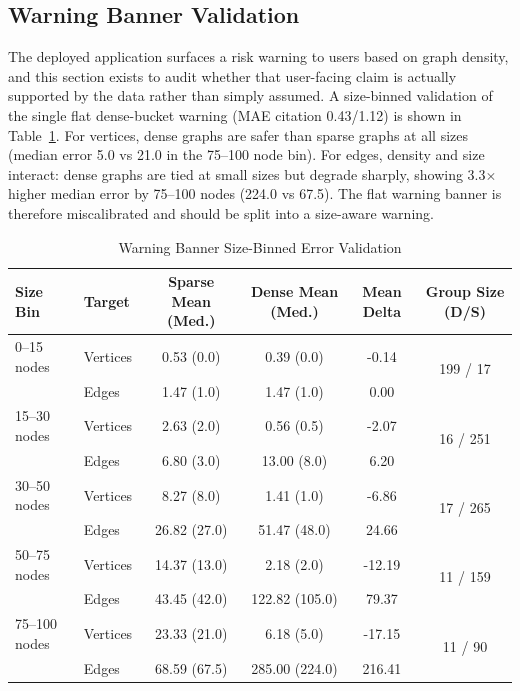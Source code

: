 \documentclass[11pt,letterpaper]{article}
\numberwithin{equation}{section}
\numberwithin{figure}{section}
\numberwithin{table}{section}
\begin{document}
\subsection{Warning Banner Validation}
The deployed application surfaces a risk warning to users based on graph density, and this section exists to audit whether that user-facing claim is actually supported by the data rather than simply assumed. A size-binned validation of the single flat dense-bucket warning (MAE citation 0.43/1.12) is shown in Table~\ref{tab:warning_validation}. For vertices, dense graphs are safer than sparse graphs at all sizes (median error 5.0 vs 21.0 in the 75--100 node bin). For edges, density and size interact: dense graphs are tied at small sizes but degrade sharply, showing 3.3$\times$ higher median error by 75--100 nodes (224.0 vs 67.5). The flat warning banner is therefore miscalibrated and should be split into a size-aware warning.

\begin{table}[htbp]
\centering
\caption{Warning Banner Size-Binned Error Validation}
\label{tab:warning_validation}
\small
\begin{tabular}{llcccc}
\toprule
Size Bin & Target & Sparse Mean (Med.) & Dense Mean (Med.) & Mean Delta & Group Size (D/S) \\
\midrule
0--15 nodes & Vertices & 0.53 (0.0) & 0.39 (0.0) & -0.14 & \multirow{2}{*}{199 / 17} \\
& Edges & 1.47 (1.0) & 1.47 (1.0) & 0.00 & \\
\midrule
15--30 nodes & Vertices & 2.63 (2.0) & 0.56 (0.5) & -2.07 & \multirow{2}{*}{16 / 251} \\
& Edges & 6.80 (3.0) & 13.00 (8.0) & 6.20 & \\
\midrule
30--50 nodes & Vertices & 8.27 (8.0) & 1.41 (1.0) & -6.86 & \multirow{2}{*}{17 / 265} \\
& Edges & 26.82 (27.0) & 51.47 (48.0) & 24.66 & \\
\midrule
50--75 nodes & Vertices & 14.37 (13.0) & 2.18 (2.0) & -12.19 & \multirow{2}{*}{11 / 159} \\
& Edges & 43.45 (42.0) & 122.82 (105.0) & 79.37 & \\
\midrule
75--100 nodes & Vertices & 23.33 (21.0) & 6.18 (5.0) & -17.15 & \multirow{2}{*}{11 / 90} \\
& Edges & 68.59 (67.5) & 285.00 (224.0) & 216.41 & \\
\bottomrule
\end{tabular}
\end{table}
\end{document}
